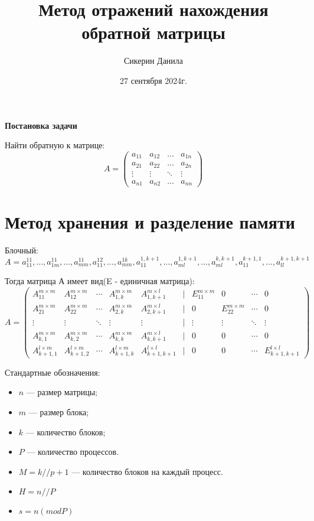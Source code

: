 \documentclass[a4paper,12pt]{article}
\begin{document}
\author{Сикерин Данила}
\title{Метод отражений нахождения обратной матрицы}
\date{27 сентября 2024г.}
\maketitle

\begin{center}
{\bfseries Постановка задачи}
\end{center}

Найти обратную к матрице:
$$A=
   \begin{pmatrix}
     a_{11}& a_{12} &\ldots & a_{1n}\\
     a_{21}& a_{22} &\ldots & a_{2n}\\
     \vdots& \vdots &\ddots & \vdots\\
     a_{n1}& a_{n2} &\ldots & a_{nn}
    \end{pmatrix}
$$ 
\section{Метод хранения и разделение памяти}
Блочный: $A = a_{11}^{11},\ldots,a_{1m}^{11},\ldots, a_{mm}^{11}, a_{11}^{12},\ldots, a_{mm}^{1k}, a_{11}^{1,k+1},\ldots, a_{ml}^{1,k+1},\ldots, a_{ml}^{k,k+1},a_{11}^{k+1,1}, \ldots, a_{ll}^{k+1,k+1}$

Тогда матрица А имеет вид(E - единичная матрица):
\begin{equation}
A=
  \begin{pmatrix} 
    A_{11}^{m \times m} & A_{12}^{m \times m} & \cdots & A_{1,k}^{m \times m} & A_{1,k+1}^{m \times l} & | & E_{11}^{m \times m} &0 & \cdots &0\\
    A_{21}^{m \times m} & A_{22}^{m \times m} & \cdots & A_{2,k}^{m \times m} & A_{2,k+1}^{m \times l} & | & 0 & E_{22}^{m \times m} & \cdots & 0\\ 
    \vdots & \vdots & \ddots & \vdots & \vdots & | & \vdots & \vdots & \ddots & \vdots\\ 
    A_{k,1}^{m \times m} & A_{k,2}^{m \times m} & \cdots & A_{k,k}^{m \times m} & A_{k,k+1}^{m \times l} & | & 0 & 0 & \cdots& 0\\
    A_{k+1,1}^{l \times m} & A_{k+1,2}^{l \times m} & \cdots & A_{k+1,k}^{l \times m} & A_{k+1,k+1}^{l \times l} & | & 0 & 0 & \cdots & E_{k+1,k+1}^{l \times l} 
  \end{pmatrix}
\end{equation}

Стандартные обозначения:
\begin{itemize}
    \item $n$ — размер матрицы;
    \item $m$ — размер блока;
    \item $k$ — количество блоков;
    \item $P$ — количество процессов.
    \item $M = k//p + 1$ — количество блоков на каждый процесс.
    \item $H = n//P$ 
    \item $s = n (mod P)$ 
  
\end{itemize}
\end{document}
